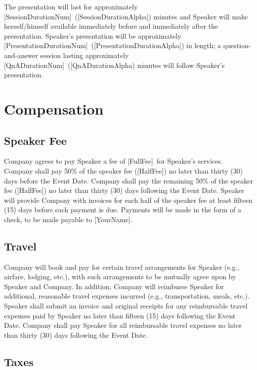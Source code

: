 \documentclass[a4paper,12pt]{article} %
\newcommand{\YourName}{[YourName]}
\newcommand{\FullFee}{[FullFee]}
\newcommand{\HalfFee}{[HalfFee]}
\newcommand{\SessionDurationNum}{[SessionDurationNum]}
\newcommand{\SessionDurationAlpha}{[SessionDurationAlpha]}
\newcommand{\PresentationDurationNum}{[PresentationDurationNum]}
\newcommand{\PresentationDurationAlpha}{[PresentationDurationAlpha]}
\newcommand{\QnADurationNum}{[QnADurationNum]}
\newcommand{\QnADurationAlpha}{[QnADurationAlpha}
\begin{document}
The presentation will last for approximately \SessionDurationNum ~(\SessionDurationAlpha) minutes and Speaker will make herself/himself available immediately before and immediately after the presentation. Speaker's presentation will be approximately \PresentationDurationNum ~(\PresentationDurationAlpha) in length; a question-and-answer session lasting approximately \QnADurationNum ~(\QnADurationAlpha) minutes will follow Speaker's presentation.



\section{Compensation}

\subsection{Speaker Fee}

Company agrees to pay Speaker a fee of \FullFee ~for Speaker's services. Company shall pay 50\% of the speaker fee (\HalfFee) no later than thirty (30) days before the Event Date. Company shall pay the remaining 50\% of the speaker fee (\HalfFee) no later than thirty (30) days following the Event Date. Speaker will provide Company with invoices for each half of the speaker fee at least fifteen (15) days before each payment is due. Payments will be made in the form of a check, to be made payable to \YourName.

\subsection{Travel}

Company will book and pay for certain travel arrangements for Speaker (e.g., airfare, lodging, etc.), with such arrangements to be mutually agree upon by Speaker and Company. In addition, Company will reimburse Speaker for additional, reasonable travel expenses incurred (e.g., transportation, meals, etc.). Speaker shall submit an invoice and original receipts for any reimbursable travel expenses paid by Speaker no later than fifteen (15) days following the Event Date. Company shall pay Speaker for all reimbursable travel expenses no later than thirty (30) days following the Event Date.

\subsection{Taxes}
\end{document}
